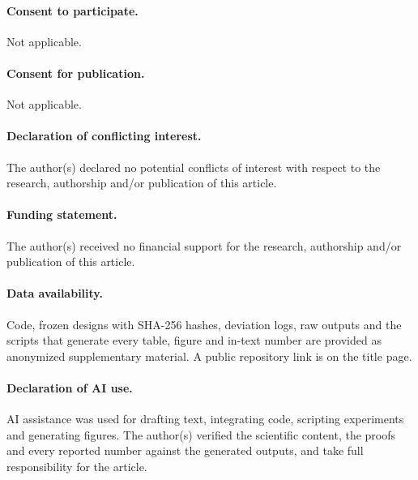 \documentclass[Crown,sagev]{sagej}
\theoremstyle{plain}
\theoremstyle{definition}
\theoremstyle{remark}
\begin{document}
\paragraph*{Consent to participate.}Not applicable.

\paragraph*{Consent for publication.}Not applicable.

\paragraph*{Declaration of conflicting interest.}The author(s) declared no potential conflicts of interest with respect to the research, authorship and/or publication of this article.

\paragraph*{Funding statement.}The author(s) received no financial support for the research, authorship and/or publication of this article.

\paragraph*{Data availability.}Code, frozen designs with SHA-256 hashes, deviation logs, raw outputs and the scripts that generate every table, figure and in-text number are provided as anonymized supplementary material. A public repository link is on the title page.

\paragraph*{Declaration of AI use.}AI assistance was used for drafting text, integrating code, scripting experiments and generating figures. The author(s) verified the scientific content, the proofs and every reported number against the generated outputs, and take full responsibility for the article.



\end{document}

